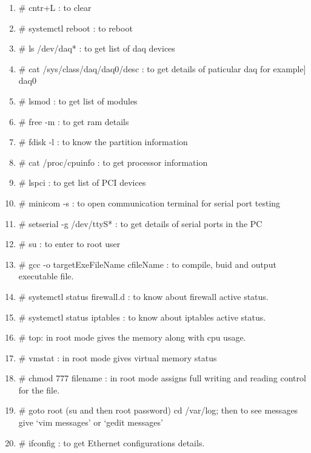 \begin{enumerate}
	\item [\textbullet] $\#$ cntr+L				: to clear
	\item [\textbullet] $\#$ systemctl reboot	: to reboot
	\item [\textbullet] $\#$ ls /dev/daq*		: to get list of daq devices
	\item [\textbullet] $\#$ cat /sys/class/daq/daq0/desc					: to get details of paticular daq for example] daq0		
	\item [\textbullet] $\#$ lsmod		: to get list of modules
	\item [\textbullet] $\#$ free -m	: to get ram details
	\item [\textbullet] $\#$ fdisk -l	: to know the partition information
	\item [\textbullet] $\#$ cat /proc/cpuinfo : to get processor information
	\item [\textbullet] $\#$ lspci	: to get list of PCI devices
	\item [\textbullet] $\#$ minicom -s : to open communication terminal for serial port testing
	\item [\textbullet] $\#$ setserial -g /dev/ttyS*	 : to get details of serial ports in the PC
	\item [\textbullet] $\#$ su	: to enter to root user
	\item [\textbullet] $\#$ gcc -o targetExeFileName cfileName	: to compile, buid and output executable file.
	\item [\textbullet] $\#$ systemctl status firewall.d	: to know about firewall active status.
	\item [\textbullet] $\#$ systemctl status iptables	: to know about iptables active status.
	\item [\textbullet] $\#$ top: in root mode gives the memory along with cpu usage.
	\item [\textbullet] $\#$ vmstat : in root mode gives virtual memory status
	\item [\textbullet] $\#$ chmod 777 filename : in root mode assigns full writing and reading control for the file.
	\item [\textbullet] $\#$ goto root (su and then root password) cd /var/log; then to see messages give `vim messages' or `gedit messages'
	\item [\textbullet] $\#$ ifconfig : to get Ethernet configurations details.
	
	
	
	
\end{enumerate}